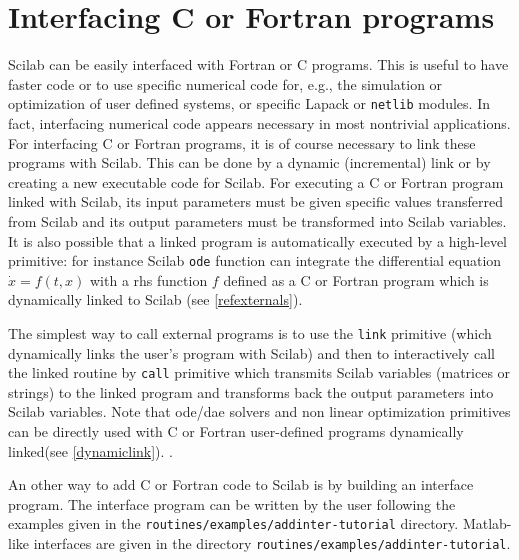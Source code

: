 
%

\chapter{Interfacing C or Fortran programs}

Scilab can be easily interfaced with Fortran or C programs. 
This is useful to have faster code or to use specific numerical
code for, e.g., the simulation or optimization of
user defined systems, or specific Lapack or {\tt netlib} modules. 
In fact, interfacing numerical code appears necessary in most
nontrivial applications. For
interfacing C or Fortran programs, it is of course necessary to link
these programs with Scilab. This can be done by a dynamic
(incremental) link or by creating a new executable code for Scilab.
For executing a C or Fortran program linked with Scilab, its
input parameters must be given specific values transferred from Scilab
and its output
parameters must be transformed into Scilab variables.
It is also possible that a linked program is automatically executed
by a high-level primitive: for instance Scilab {\tt ode} function
can integrate the differential equation $\dot{x} = f(t,x)$ with a
rhs function $f$ defined as a C or Fortran program which is
dynamically linked to Scilab (see \ref{refexternals}).


\bigskip
{}


The simplest way to call external programs is to use the  
{\tt link} primitive
(which dynamically links the user's program with Scilab)
and then to interactively call
the linked routine by {\tt call} primitive
which transmits Scilab variables (matrices or strings) to the linked program
and transforms back the output parameters into Scilab variables. 
Note that ode/dae solvers and non linear optimization primitives
can be directly used with C or Fortran user-defined programs
dynamically linked(see \ref{dynamiclink}). . 

An other way to add C or Fortran code to Scilab is by 
building an interface program. The interface program can be written by
the user following the examples given in the 
{\tt routines/examples/addinter-tutorial}
directory. Matlab-like interfaces are given in the directory
{\tt routines/examples/addinter-tutorial}.

